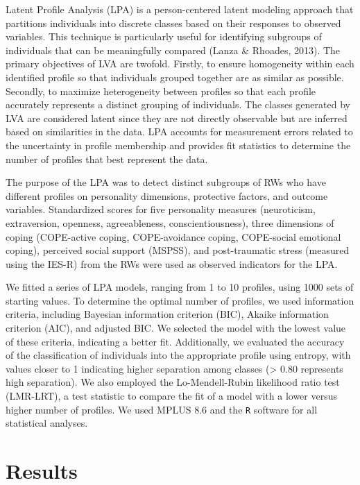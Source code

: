 \documentclass[
  man]{apa6}
\begin{document}
Latent Profile Analysis (LPA) is a person-centered latent modeling approach that partitions individuals into discrete classes based on their responses to observed variables. This technique is particularly useful for identifying subgroups of individuals that can be meaningfully compared (Lanza \& Rhoades, 2013). The primary objectives of LVA are twofold. Firstly, to ensure homogeneity within each identified profile so that individuals grouped together are as similar as possible. Secondly, to maximize heterogeneity between profiles so that each profile accurately represents a distinct grouping of individuals. The classes generated by LVA are considered latent since they are not directly observable but are inferred based on similarities in the data. LPA accounts for measurement errors related to the uncertainty in profile membership and provides fit statistics to determine the number of profiles that best represent the data.

The purpose of the LPA was to detect distinct subgroups of RWs who have different profiles on personality dimensions, protective factors, and outcome variables. Standardized scores for five personality measures (neuroticism, extraversion, openness, agreeableness, conscientiousness), three dimensions of coping (COPE-active coping, COPE-avoidance coping, COPE-social emotional coping), perceived social support (MSPSS), and post-traumatic stress (measured using the IES-R) from the RWs were used as observed indicators for the LPA.

We fitted a series of LPA models, ranging from 1 to 10 profiles, using 1000 sets of starting values. To determine the optimal number of profiles, we used information criteria, including Bayesian information criterion (BIC), Akaike information criterion (AIC), and adjusted BIC. We selected the model with the lowest value of these criteria, indicating a better fit. Additionally, we evaluated the accuracy of the classification of individuals into the appropriate profile using entropy, with values closer to 1 indicating higher separation among classes (\textgreater{} 0.80 represents high separation). We also employed the Lo-Mendell-Rubin likelihood ratio test (LMR-LRT), a test statistic to compare the fit of a model with a lower versus higher number of profiles. We used MPLUS 8.6 and the \texttt{R} software for all statistical analyses.

\hypertarget{results}{%
\section{Results}\label{results}}
\end{document}
